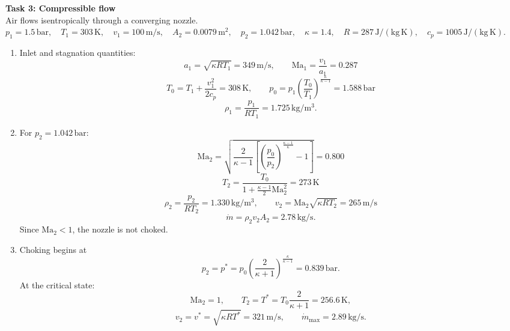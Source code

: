 \documentclass[9pt, landscape, a4paper]{article}
\begin{document}
\begin{multicols*}{3}
\textbf{Task 3: Compressible flow}\\
Air flows isentropically through a converging nozzle.\\
$p_1=1.5\,\mathrm{bar},\quad T_1=303\,\mathrm{K},\quad
v_1=100\,\mathrm{m/s},\quad A_2=0.0079\,\mathrm{m^2},\quad
p_2=1.042\,\mathrm{bar},\quad \kappa=1.4,\quad
R=287\,\mathrm{J/(kg\,K)},\quad c_p=1005\,\mathrm{J/(kg\,K)}$.
\begin{enumerate}[label=(\alph*)]
  \item Inlet and stagnation quantities:
    \[
      a_1=\sqrt{\kappa RT_1}=349\,\mathrm{m/s},\qquad
      \mathrm{Ma}_1=\frac{v_1}{a_1}=0.287
    \]
    \[
      T_0=T_1+\frac{v_1^2}{2c_p}=308\,\mathrm{K},
      \qquad
      p_0=p_1\left(\frac{T_0}{T_1}\right)^{
      \frac{\kappa}{\kappa-1}}
      =1.588\,\mathrm{bar}
    \]
    \[
      \rho_1=\frac{p_1}{RT_1}=1.725\,\mathrm{kg/m^3}.
    \]
  \item For $p_2=1.042\,\mathrm{bar}$:
    \[
      \mathrm{Ma}_2=
      \sqrt{\frac{2}{\kappa-1}
      \left[\left(\frac{p_0}{p_2}\right)^{
      \frac{\kappa-1}{\kappa}}-1\right]}
      =0.800
    \]
    \[
      T_2=\frac{T_0}{1+\frac{\kappa-1}{2}\mathrm{Ma}_2^2}
      =273\,\mathrm{K}
    \]
    \[
      \rho_2=\frac{p_2}{RT_2}=1.330\,\mathrm{kg/m^3},
      \qquad
      v_2=\mathrm{Ma}_2\sqrt{\kappa RT_2}
      =265\,\mathrm{m/s}
    \]
    \[
      \dot m=\rho_2v_2A_2=2.78\,\mathrm{kg/s}.
    \]
    Since $\mathrm{Ma}_2<1$, the nozzle is not choked.
  \item Choking begins at
    \[
      p_2=p^*=p_0\left(\frac{2}{\kappa+1}\right)^{
      \frac{\kappa}{\kappa-1}}
      =0.839\,\mathrm{bar}.
    \]
    At the critical state:
    \[
      \mathrm{Ma}_2=1,\qquad
      T_2=T^*=T_0\frac{2}{\kappa+1}=256.6\,\mathrm{K},
    \]
    \[
      v_2=v^*=\sqrt{\kappa RT^*}=321\,\mathrm{m/s},
      \qquad
      \dot m_\mathrm{max}=2.89\,\mathrm{kg/s}.
    \]
\end{enumerate}


\end{multicols*}
\end{document}
